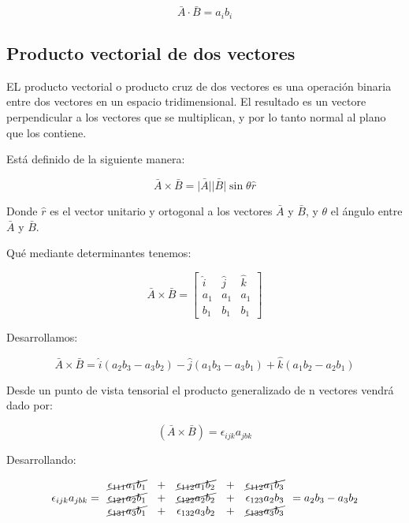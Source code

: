 \documentclass{article}
\providecommand{\abs}[1]{\lvert#1\rvert}
\begin{document}
\begin{equation}
    \bar{A} \cdot \bar{B} = a_i b_i
\end{equation}

\subsection{Producto vectorial de dos vectores}

EL producto vectorial o producto cruz de dos vectores es una operación binaria
entre dos vectores en un espacio tridimensional. El resultado es un vectore
perpendicular a los vectores que se multiplican, y por lo tanto normal al plano
que los contiene.

Está definido de la siguiente manera:

\begin{equation}
    \bar{A} \times \bar{B}= \bar{\abs{A}} \bar{\abs{B}} \sin \theta \hat{r}
\end{equation}

Donde $\hat{r}$ es el vector unitario y ortogonal a los vectores $\bar{A}$ y
$\bar{B}$, y $\theta$ el ángulo entre $\bar{A}$ y $\bar{B}$.

Qué mediante determinantes tenemos:

\begin{equation}
    \bar{A} \times \bar{B}=
    \begin{bmatrix}
        \hat{i} & \hat{j} & \hat{k}\\ 
         a_1 & a_1 & a_1\\ 
         b_1 & b_1 & b_1
    \end{bmatrix}
\end{equation}

Desarrollamos:

\begin{equation}
    \bar{A} \times \bar{B}= \hat{i}(a_2 b_3 - a_3 b_2) - \hat{j}(a_1 b_3 - a_3 b_1) + \hat{k}(a_1 b_2 - a_2 b_1)
\end{equation}

Desde un punto de vista tensorial el producto generalizado de n vectores vendrá
dado por:

\begin{equation}
    (\bar{A} \times \bar{B}) = \epsilon_{ijk} a_{jbk}
\end{equation}

Desarrollando:

\begin{equation}
    \epsilon_{ijk} a_{jbk} =
    \begin{array}{ccccc}
        \cancel{\epsilon_{111} a_1 b_1} & + & \cancel{\epsilon_{112} a_1 b_2}   & + & \cancel{\epsilon_{112} a_1 b_3}   \\
        \cancel{\epsilon_{121} a_2 b_1} & + & \cancel{\epsilon_{122} a_2 b_2}   & + & \epsilon_{123} a_2 b_3            \\
        \cancel{\epsilon_{131} a_3 b_1} & + & \epsilon_{132} a_3 b_2            & + & \cancel{\epsilon_{133} a_3 b_3}
    \end{array}
    = a_2 b_3 - a_3 b_2
\end{equation}
\end{document}
